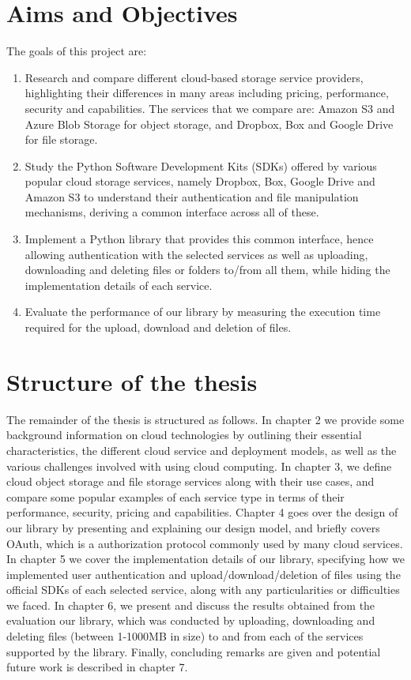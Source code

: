 \section{Aims and Objectives}
The goals of this project are:

\begin{enumerate}
	\item Research and compare different cloud-based storage service providers, highlighting their differences in many areas including pricing, performance, security and capabilities. The services that we compare are: Amazon S3 and Azure Blob Storage for object storage, and Dropbox, Box and Google Drive for file storage.
	
	\item Study the Python Software Development Kits (SDKs) offered by various popular cloud storage services, namely Dropbox, Box, Google Drive and Amazon S3 to understand their authentication and file manipulation mechanisms, deriving a common interface across all of these.
	
	\item Implement a Python library that provides this common interface, hence allowing authentication with the selected services as well as uploading, downloading and deleting files or folders to/from all them, while hiding the implementation details of each service.
	
	\item Evaluate the performance of our library by measuring the execution time required for the upload, download and deletion of files.
\end{enumerate}

\section{Structure of the thesis}
The remainder of the thesis is structured as follows. In chapter 2 we provide some background information on cloud technologies by outlining their essential characteristics, the different cloud service and deployment models, as well as the various challenges involved with using cloud computing. In chapter 3, we define cloud object storage and file storage services along with their use cases, and compare some popular examples of each service type in terms of their performance, security, pricing and capabilities. Chapter 4 goes over the design of our library by presenting and explaining our design model, and briefly covers OAuth, which is a authorization protocol commonly used by many cloud services. In chapter 5 we cover the implementation details of our library, specifying how we implemented user authentication and upload/download/deletion of files using the official SDKs of each selected service, along with any particularities or difficulties we faced. In chapter 6, we present and discuss the results obtained from the evaluation our library, which was conducted by uploading, downloading and deleting files (between 1-1000MB in size) to and from each of the services supported by the library. Finally, concluding remarks are given and potential future work is described in chapter 7.

